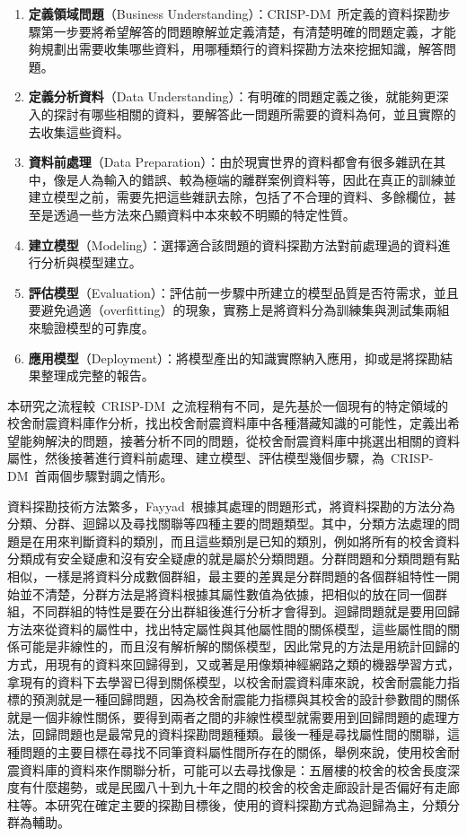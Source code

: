 \begin{enumerate}
\item \textbf{定義領域問題}（Business Understanding）：CRISP-DM~所定義的資料探勘步驟第一步要將希望解答的問題瞭解並定義清楚，有清楚明確的問題定義，才能夠規劃出需要收集哪些資料，用哪種類行的資料探勘方法來挖掘知識，解答問題。
\item \textbf{定義分析資料}（Data Understanding）：有明確的問題定義之後，就能夠更深入的探討有哪些相關的資料，要解答此一問題所需要的資料為何，並且實際的去收集這些資料。
\item \textbf{資料前處理}（Data Preparation）：由於現實世界的資料都會有很多雜訊在其中，像是人為輸入的錯誤、較為極端的離群案例資料等，因此在真正的訓練並建立模型之前，需要先把這些雜訊去除，包括了不合理的資料、多餘欄位，甚至是透過一些方法來凸顯資料中本來較不明顯的特定性質。
\item \textbf{建立模型}（Modeling）：選擇適合該問題的資料探勘方法對前處理過的資料進行分析與模型建立。
\item \textbf{評估模型}（Evaluation）：評估前一步驟中所建立的模型品質是否符需求，並且要避免過適（overfitting）的現象，實務上是將資料分為訓練集與測試集兩組來驗證模型的可靠度。
\item \textbf{應用模型}（Deployment）：將模型產出的知識實際納入應用，抑或是將探勘結果整理成完整的報告。
\end{enumerate}

本研究之流程較~CRISP-DM~之流程稍有不同，是先基於一個現有的特定領域的校舍耐震資料庫作分析，找出校舍耐震資料庫中各種潛藏知識的可能性，定義出希望能夠解決的問題，接著分析不同的問題，從校舍耐震資料庫中挑選出相關的資料屬性，然後接著進行資料前處理、建立模型、評估模型幾個步驟，為~CRISP-DM~首兩個步驟對調之情形。

資料探勘技術方法繁多，Fayyad~\cite{fayyad1996data}根據其處理的問題形式，將資料探勘的方法分為分類、分群、迴歸以及尋找關聯等四種主要的問題類型。其中，分類方法處理的問題是在用來判斷資料的類別，而且這些類別是已知的類別，例如將所有的校舍資料分類成有安全疑慮和沒有安全疑慮的就是屬於分類問題。分群問題和分類問題有點相似，一樣是將資料分成數個群組，最主要的差異是分群問題的各個群組特性一開始並不清楚，分群方法是將資料根據其屬性數值為依據，把相似的放在同一個群組，不同群組的特性是要在分出群組後進行分析才會得到。迴歸問題就是要用回歸方法來從資料的屬性中，找出特定屬性與其他屬性間的關係模型，這些屬性間的關係可能是非線性的，而且沒有解析解的關係模型，因此常見的方法是用統計回歸的方式，用現有的資料來回歸得到，又或著是用像類神經網路之類的機器學習方式，拿現有的資料下去學習已得到關係模型，以校舍耐震資料庫來說，校舍耐震能力指標的預測就是一種回歸問題，因為校舍耐震能力指標與其校舍的設計參數間的關係就是一個非線性關係，要得到兩者之間的非線性模型就需要用到回歸問題的處理方法，回歸問題也是最常見的資料探勘問題種類。最後一種是尋找屬性間的關聯，這種問題的主要目標在尋找不同筆資料屬性間所存在的關係，舉例來說，使用校舍耐震資料庫的資料來作關聯分析，可能可以去尋找像是：五層樓的校舍的校舍長度深度有什麼趨勢，或是民國八十到九十年之間的校舍的校舍走廊設計是否偏好有走廊柱等。本研究在確定主要的探勘目標後，使用的資料探勘方式為迴歸為主，分類分群為輔助。

